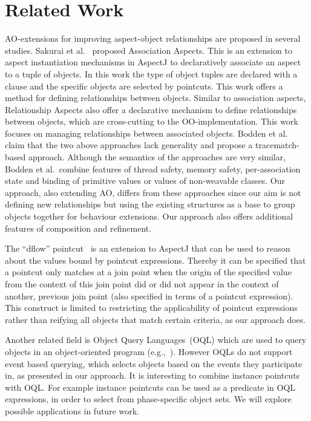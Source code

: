 \section{Related Work}
AO-extensions for improving aspect-object relationships are proposed in several studies. Sakurai et al.~\cite{sakurai2004association} proposed Association Aspects. This is an extension to aspect instantiation mechanisms in AspectJ to declaratively associate an aspect to a tuple of objects. In this work the type of object tuples are declared with a  clause and the specific objects are selected by pointcuts. This work offers a method for defining relationships between objects. Similar to association aspects, Relationship Aspects \cite{pearce2006relationship} also offer a declarative mechanism to define relationships between objects, which are cross-cutting to the OO-implementation. This work focuses on managing relationships between associated objects. Bodden et al.~\cite{bodden2008relational} claim that the two above approaches lack generality and propose a tracematch-based approach. Although the semantics of the approaches are very similar, Bodden et al.\ combine features of thread safety, memory safety, per-association state and binding of primitive values or values of non-weavable classes. Our approach, also extending AO, differs from these approaches since our aim is not defining new relationships but using the existing structures as a base to group objects together for behaviour extensions. Our approach also offers additional features of composition and refinement.

The ``dflow'' pointcut~\cite{kawauchi:aosd-aosdsec04} is an extension to AspectJ that can be used to reason about the values bound by pointcut expressions. Thereby it can be specified that a pointcut only matches at a join point when the origin of the specified value from the context of this join point did or did not appear in the context of another, previous join point (also specified in terms of a pointcut expression). This construct is limited to restricting the applicability of pointcut expressions rather than reifying all objects that match certain criteria, as our approach does.

Another related field is Object Query Languages~(OQL) which are used to query objects in an object-oriented program (e.g.,~\cite{cluet1998designing}). However OQLs do not support event based querying, which selects objects based on the events they participate in, as presented in our approach. It is interesting to combine instance pointcuts with OQL. For example instance pointcuts can be used as a predicate in OQL expressions, in order to select from phase-specific object sets. We will explore possible applications in future work. 


